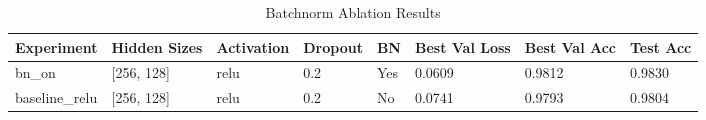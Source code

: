 \begin{table}[t]
    \centering
    \caption{Batchnorm Ablation Results}
    \label{tab:batchnorm_ablation}
    \begin{tabular}{llllllll}
        \toprule
        Experiment & Hidden Sizes & Activation & Dropout & BN & Best Val Loss & Best Val Acc & Test Acc \\
        \midrule
        bn_on & [256, 128] & relu & 0.2 & Yes & 0.0609 & 0.9812 & 0.9830 \\
        baseline_relu & [256, 128] & relu & 0.2 & No & 0.0741 & 0.9793 & 0.9804 \\
        \bottomrule
    \end{tabular}
\end{table}